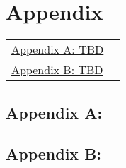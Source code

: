 
\chapter{Appendix}

\begin{tabular}{p{14.9cm}r}
\hyperref[app:A]{Appendix A: TBD} & \pageref{app:A} \\
\hyperref[app:B]{Appendix B: TBD} & \pageref{app:B} \\
\end{tabular}
\pagebreak

\section*{Appendix A:}
\label{app:A} 

\section*{Appendix B:}
\label{app:B}
